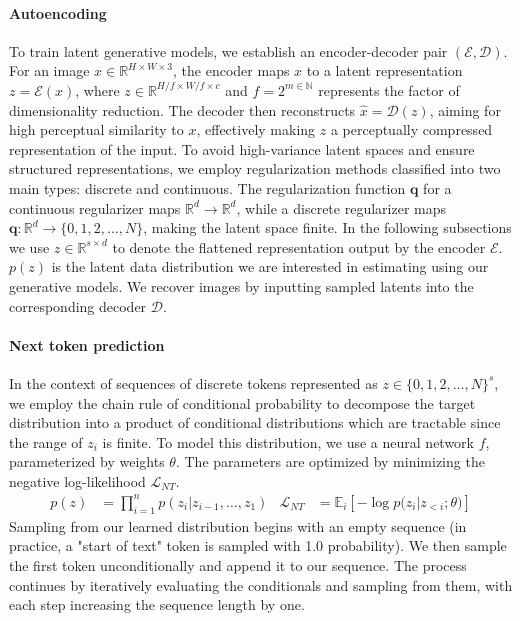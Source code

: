 \paragraph{Autoencoding}
To train latent generative models, we establish an encoder-decoder pair \((\mathcal{E}, \mathcal{D})\). For an image \(x \in \mathbb{R}^{H \times W \times 3}\), the encoder maps \(x\) to a latent representation \(z = \mathcal{E}(x)\), where \(z \in \mathbb{R}^{H/f \times W/f \times c}\) and \(f = 2^{m \in \mathbb{N}}\) represents the factor of dimensionality reduction. The decoder then reconstructs \(\hat{x} = \mathcal{D}(z)\), aiming for high perceptual similarity to \(x\), effectively making \(z\) a perceptually compressed representation of the input. To avoid high-variance latent spaces and ensure structured representations, we employ regularization methods classified into two main types: discrete and continuous. The regularization function \(\textbf{q}\) for a continuous regularizer maps \(\mathbb{R}^d \to \mathbb{R}^d\), while a discrete regularizer maps \(\textbf{q}: \mathbb{R}^d \to \{0, 1, 2, \ldots, N\}\), making the latent space finite. In the following subsections we use $z \in \mathbb{R}^{s \times d}$ to denote the flattened representation output by the encoder $\mathcal{E}$. $p(z)$ is the latent data distribution we are interested in estimating using our generative models. We recover images by inputting sampled latents into the corresponding decoder $\mathcal{D}$.

\paragraph{Next token prediction}
In the context of sequences of discrete tokens represented as \( z \in \{0, 1, 2, \ldots, N\}^{s} \), we employ the chain rule of conditional probability to decompose the target distribution into a product of conditional distributions which are tractable since the range of $z_i$ is finite. To model this distribution, we use a neural network \( f \), parameterized by weights \( \theta \). The parameters are optimized by minimizing the negative log-likelihood \( \mathcal{L}_{NT} \).
\vspace{-2pt}
\begin{align}
p(z) &= \prod_{i=1}^{n} p(z_i | z_{i-1}, \ldots, z_1) & \mathcal{L}_{NT} &= \mathbb{E}_i [ -\log{p(z_i | z_{<i}; \theta}) ]
\end{align}
\vspace{-2pt}
Sampling from our learned distribution begins with an empty sequence (in practice, a "start of text" token is sampled with 1.0 probability). We then sample the first token unconditionally and append it to our sequence. The process continues by iteratively evaluating the conditionals and sampling from them, with each step increasing the sequence length by one.


